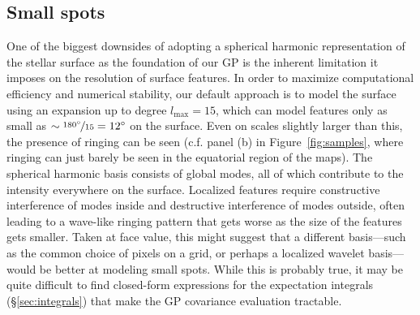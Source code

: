 \documentclass[modern]{aastex62}
\begin{document}
\subsection{Small spots}
\label{sec:tinyspots}

One of the biggest downsides of adopting a spherical harmonic representation
of the stellar surface as the foundation of our GP is the inherent limitation
it imposes on the resolution of surface features. In order to maximize
computational efficiency and numerical stability, our default approach is to
model the surface using an expansion up to degree $l_\mathrm{max} = 15$,
which can model features only as small as
$\sim \nicefrac{180^\circ}{15} = 12^\circ$ on the surface. Even on scales
slightly larger than this, the presence of ringing can be seen
(c.f. panel (b) in Figure~\ref{fig:samples}, where ringing can just barely be
seen in the equatorial region of the maps). The spherical harmonic basis consists
of global modes, all of which contribute to the intensity everywhere on the surface.
Localized features require constructive interference of modes inside
and destructive interference of modes outside, often leading to a wave-like ringing
pattern that gets worse as the size of the features gets smaller. Taken at
face value, this might suggest that a different basis---such as the common
choice of pixels on a grid, or perhaps a localized wavelet basis---would be better
at modeling small spots. While this is probably true, it may be quite
difficult to find closed-form expressions for the expectation integrals
(\S\ref{sec:integrals}) that make the GP covariance evaluation tractable.
\end{document}
